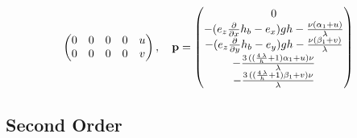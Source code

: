\documentclass{article}
\begin{document}
\begin{gather}
\begin{pmatrix}
          0 & 0 & 0 & 0 & u \\
          0 & 0 & 0 & 0 & v
        \end{pmatrix}, \quad
        \mathbf{p} =
        \begin{pmatrix}
          0 \\
          -{(e_{z} \frac{\partial}{\partial x}h_{b} - e_{x})} g h - \frac{\nu {(\alpha_{1} + u)}}{\lambda} \\
          -{(e_{z} \frac{\partial}{\partial y}h_{b} - e_{y})} g h - \frac{\nu {(\beta_{1} + v)}}{\lambda} \\
          -\frac{3 \, {({(\frac{4 \, \lambda}{h} + 1)} \alpha_{1} + u)} \nu}{\lambda} \\
          -\frac{3 \, {({(\frac{4 \, \lambda}{h} + 1)} \beta_{1} + v)} \nu}{\lambda}
        \end{pmatrix}
      \end{gather}

    \subsection{Second Order}
\end{document}
